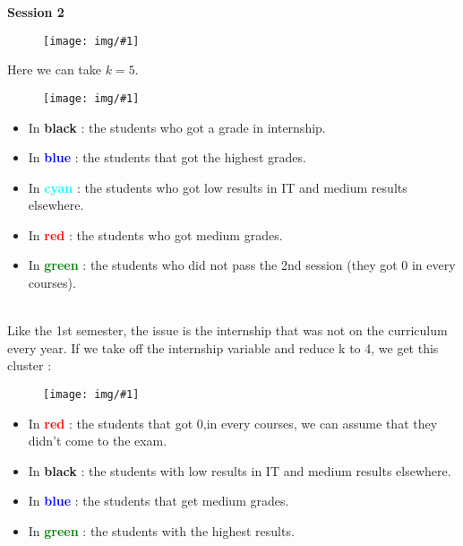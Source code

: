 \documentclass[11pt, a4paper]{article}
\newcommand\image[2]{
	\begin{figure}[H]
	\centering
	\texttt{[image: img/\#1]}
	\end{figure}
}
\begin{document}
    \newpage

    \textbf{\large{Session 2}}

    \image{image29.png}{380px}

    Here we can take $k=5$.

    \image{image30.png}{480px}
    
    \begin{multicols}{2}
        \begin{itemize}
            \item In \textbf{black} : the students who got a grade in internship. 
            \item In \textbf{\textcolor{blue}{blue}} : the students that got the highest grades. 
            \item In \textbf{\textcolor{cyan}{cyan}} : the students who got low results in IT and medium results elsewhere.
            \item In \textbf{\textcolor{red}{red}} : the students who got medium grades. 
            \item In \textbf{\textcolor{green}{green}} : the students who did not pass the 2nd session (they got 0 in every courses).\\\\
        \end{itemize}
    \end{multicols}

    \newpage

    Like the 1st semester, the issue is the internship that was not on the curriculum every year. If we take off the internship variable and reduce k to 4, we get this cluster :
    \image{image31.png}{480px}

    \begin{multicols}{2}
        \begin{itemize}
            \item In \textbf{\textcolor{red}{red}} : the students that got 0,in every courses, we can assume that they didn’t come to the exam.
            \item In \textbf{black} : the students with low results in IT  and medium results elsewhere. 
            \item In \textbf{\textcolor{blue}{blue}} :  the students that get medium grades. 
            \item In \textbf{\textcolor{green}{green}} : the students with the highest results.\\
        \end{itemize}
    \end{multicols}
\end{document}
